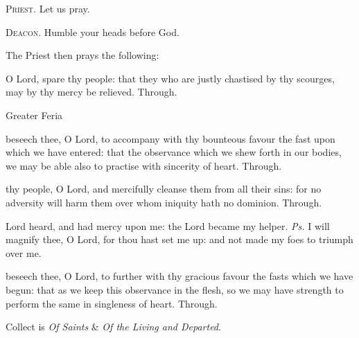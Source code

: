 \textsc{Priest.} Let us pray.\par
\textsc{Deacon.} Humble your heads before God.\par
\begin{rubric}
    The Priest then prays the following:
\end{rubric}
 O Lord, spare thy people: that they who are justly chastised by thy scourges, may by thy mercy be relieved. Through.


\begin{inhead}
    {Greater Feria}
\end{inhead}

\begin{paracol}{2}

 beseech thee, O Lord, to accompany with thy bounteous favour the fast upon which we have entered: that the observance which we shew forth in our bodies, we may be able also to practise with sincerity of heart. Through.

\switchcolumn


 thy people, O Lord, and mercifully cleanse them from all their sins: for no adversity will harm them over whom iniquity hath no dominion. Through.

\end{paracol}

\introit
{} Lord heard, and had mercy upon me: the Lord became my helper. \textit{Ps.} I will magnify thee, O Lord, for thou hast set me up: and not made my foes to triumph over me.

\collect
{} beseech thee, O Lord, to further with thy gracious favour the fasts which we have begun: that as we keep this observance in the flesh, so we may have strength to perform the same in singleness of heart. Through.

\begin{rubric}
     Collect is \emph{Of Saints} \&  \emph{Of the Living and Departed}.
\end{rubric}

